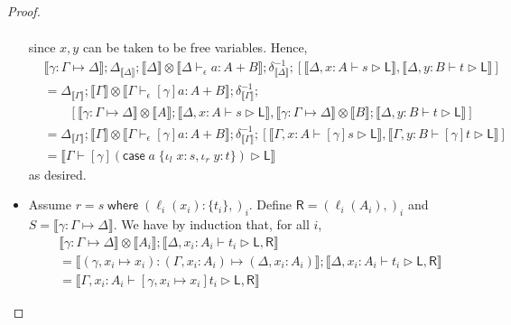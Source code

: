 \documentclass[acmsmall,screen,review]{acmart}
\newcommand{\ms}[1]{\ensuremath{\mathsf{#1}}}
\newcommand{\lto}{:}
\newcommand{\linl}[1]{\iota_l\;{#1}}
\newcommand{\linr}[1]{\iota_r\;{#1}}
\newcommand{\casestmt}[5]{\ms{case}\;#1\;\{\linl{#2} \lto #3, \linr{#4} \lto #5\}}
\newcommand{\where}[2]{#1\;\ms{where}\;#2}
\newcommand{\wbranch}[3]{#1(#2) \lto \{#3\}}
\newcommand{\bhyp}[2]{#1 : #2}
\newcommand{\hasty}[4]{#1 \vdash_{#2} #3: {#4}}
\newcommand{\haslb}[3]{#1 \vdash #2 \rhd #3}
\newcommand{\issubst}[3]{#1: #2 \mapsto #3}
\newcommand{\dnt}[1]{\llbracket{#1}\rrbracket}
\begin{document}
\begin{proof}
\begin{itemize}[leftmargin=*]
\begin{equation}
\begin{aligned}
      \end{aligned}
    \end{equation}
    since $x, y$ can be taken to be free variables. Hence,
    \begin{equation}
      \begin{aligned}
        & \dnt{\issubst{\gamma}{\Gamma}{\Delta}}
        ; \Delta_{\dnt{\Delta}} 
        ; \dnt{\Delta} \otimes \dnt{\hasty{\Delta}{\epsilon}{a}{A + B}}
        ; \delta^{-1}_{\dnt{\Delta}} 
        ; [
          \dnt{\haslb{\Delta, \bhyp{x}{A}}{s}{\ms{L}}}, 
          \dnt{\haslb{\Delta, \bhyp{y}{B}}{t}{\ms{L}}}
        ] 
        \\ &
        = \Delta_{\dnt{\Gamma}}
        ; \dnt{\Gamma} \otimes \dnt{\hasty{\Gamma}{\epsilon}{[\gamma]a}{A + B}}
        ; \delta^{-1}_{\dnt{\Gamma}}
        ;  \\ & \qquad
        [
          \dnt{\issubst{\gamma}{\Gamma}{\Delta}} \otimes \dnt{A} 
            ; \dnt{\haslb{\Delta, \bhyp{x}{A}}{s}{\ms{L}}}, 
          \dnt{\issubst{\gamma}{\Gamma}{\Delta}} \otimes \dnt{B} 
            ; \dnt{\haslb{\Delta, \bhyp{y}{B}}{t}{\ms{L}}}
        ] 
        \\ &
        = \Delta_{\dnt{\Gamma}}
        ; \dnt{\Gamma} \otimes \dnt{\hasty{\Gamma}{\epsilon}{[\gamma]a}{A + B}}
        ; \delta^{-1}_{\dnt{\Gamma}} 
        ; [
          \dnt{\haslb{\Gamma, \bhyp{x}{A}}{[\gamma]s}{\ms{L}}}, 
          \dnt{\haslb{\Gamma, \bhyp{y}{B}}{[\gamma]t}{\ms{L}}}
        ]
        \\ &
        = \dnt{\haslb{\Gamma}{[\gamma](\casestmt{a}{x}{s}{y}{t})}{\ms{L}}}
      \end{aligned}
    \end{equation}
    as desired.
    \item Assume $r = \where{s}{(\wbranch{\ell_i}{x_i}{t_i},)_i}$. Define $\ms{R} =
    (\ell_i(A_i),)_i$ and $S = \dnt{\issubst{\gamma}{\Gamma}{\Delta}}$. We have by induction that,
    for all $i$,
    \begin{equation}
      \begin{aligned}
      & \dnt{\issubst{\gamma}{\Gamma}{\Delta}} \otimes \dnt{A_i} 
      ; \dnt{\haslb{\Delta, \bhyp{x_i}{A_i}}{t_i}{\ms{L}, \ms{R}}}
      \\ &= \dnt{\issubst{(\gamma, x_i \mapsto x_i)}  
                  {(\Gamma, \bhyp{x_i}{A_i})}{(\Delta, \bhyp{x_i}{A_i})}}
      ; \dnt{\haslb{\Delta, \bhyp{x_i}{A_i}}{t_i}{\ms{L}, \ms{R}}}
      \\ &= \dnt{\haslb{\Gamma, \bhyp{x_i}{A_i}}{[\gamma, x_i \mapsto x_i]t_i}{\ms{L}, \ms{R}}}

\end{aligned}
\end{equation}
\end{itemize}
\end{proof}
\end{document}
